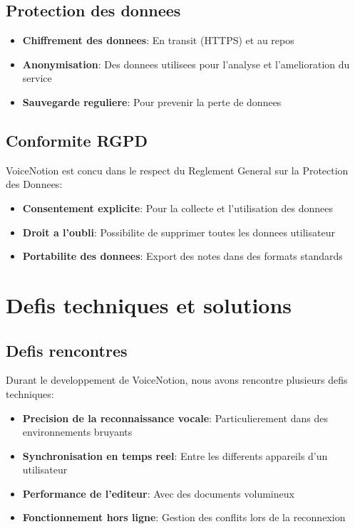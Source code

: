\subsection{Protection des donnees}
\begin{itemize}
    \item \textbf{Chiffrement des donnees}: En transit (HTTPS) et au repos
    \item \textbf{Anonymisation}: Des donnees utilisees pour l'analyse et l'amelioration du service
    \item \textbf{Sauvegarde reguliere}: Pour prevenir la perte de donnees
\end{itemize}

\subsection{Conformite RGPD}
VoiceNotion est concu dans le respect du Reglement General sur la Protection des Donnees:
\begin{itemize}
    \item \textbf{Consentement explicite}: Pour la collecte et l'utilisation des donnees
    \item \textbf{Droit a l'oubli}: Possibilite de supprimer toutes les donnees utilisateur
    \item \textbf{Portabilite des donnees}: Export des notes dans des formats standards
\end{itemize}

\section{Defis techniques et solutions}
\subsection{Defis rencontres}
Durant le developpement de VoiceNotion, nous avons rencontre plusieurs defis techniques:
\begin{itemize}
    \item \textbf{Precision de la reconnaissance vocale}: Particulierement dans des environnements bruyants
    \item \textbf{Synchronisation en temps reel}: Entre les differents appareils d'un utilisateur
    \item \textbf{Performance de l'editeur}: Avec des documents volumineux
    \item \textbf{Fonctionnement hors ligne}: Gestion des conflits lors de la reconnexion
\end{itemize}

